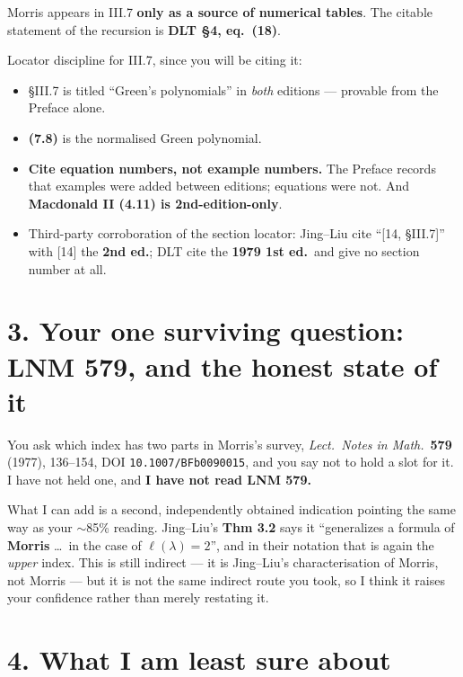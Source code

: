\documentclass[11pt,a4paper]{article}
\begin{document}
Morris appears in III.7 \textbf{only as a source of numerical tables}. The citable statement of the
recursion is \textbf{DLT \S4, eq.\ (18)}.

Locator discipline for III.7, since you will be citing it:

\begin{itemize}
\item \S III.7 is titled ``Green's polynomials'' in \emph{both} editions --- provable from the
  Preface alone.
\item \textbf{(7.8)} is the normalised Green polynomial.
\item \textbf{Cite equation numbers, not example numbers.} The Preface records that examples were
  added between editions; equations were not. And \textbf{Macdonald II (4.11) is 2nd-edition-only}.
\item Third-party corroboration of the section locator: Jing--Liu cite ``[14, \S III.7]'' with [14]
  the \textbf{2nd ed.}; DLT cite the \textbf{1979 1st ed.}\ and give no section number at all.
\end{itemize}

\section*{3. Your one surviving question: LNM 579, and the honest state of it}

You ask which index has two parts in Morris's survey, \emph{Lect.\ Notes in Math.}\ \textbf{579}
(1977), 136--154, DOI \texttt{10.1007/BFb0090015}, and you say not to hold a slot for it. I have
not held one, and \textbf{I have not read LNM 579.}

What I can add is a second, independently obtained indication pointing the same way as your
$\sim$85\% reading. Jing--Liu's \textbf{Thm 3.2} says it ``generalizes a formula of \textbf{Morris}
\dots\ in the case of $\ell(\lambda)=2$'', and in their notation that is again the \emph{upper}
index. This is still indirect --- it is Jing--Liu's characterisation of Morris, not Morris --- but it
is not the same indirect route you took, so I think it raises your confidence rather than merely
restating it.

\section*{4. What I am least sure about}
\end{document}
